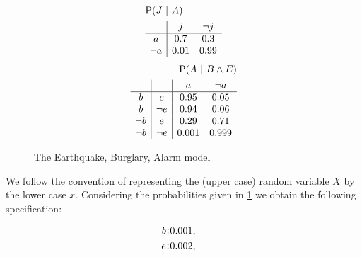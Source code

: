 \documentclass[a4paper, 10pt]{article}
\newcommand{\at}[1]{\ensuremath{\!\del{#1}}}
\newcommand{\pr}[1]{\ensuremath{\mathrm{P}\at{#1}}}
\newcommand{\given}{\ensuremath{~\middle|~}}
\newcommand{\probfact}[2]{\ensuremath{#2\mkern-4mu:\mkern-4mu#1}}
\begin{document}
\begin{figure}
\begin{multicols}{3}
        \footnotesize{
            \begin{equation*}
                \begin{split}
                    &\pr{J \given A}\\
                    &  \begin{array}{c|cc}
                               & j    & \neg j \\
                        \hline
                        a      & 0.7  & 0.3    \\
                        \neg a & 0.01 & 0.99
                    \end{array}
                \end{split}
            \end{equation*}
        }
        \footnotesize{
            \begin{equation*}
                \begin{split}
                    \pr{A \given B \wedge E}\\
                    \begin{array}{c|c|cc}
                               &        & a     & \neg a \\
                        \hline
                        b      & e      & 0.95  & 0.05   \\
                        b      & \neg e & 0.94  & 0.06   \\
                        \neg b & e      & 0.29  & 0.71   \\
                        \neg b & \neg e & 0.001 & 0.999
                    \end{array}
                \end{split}
            \end{equation*}
        }
    \end{multicols}
    \caption{The Earthquake, Burglary, Alarm model}
    \label{Figure_Alarm}
\end{figure}

We follow the convention of representing the (upper case) random variable $X$ by the lower case $x$.
%
Considering the probabilities given in \cref{Figure_Alarm} we obtain the following spe\-ci\-fi\-ca\-tion:

\begin{equation*}
    \begin{aligned}
        \probfact{0.001}{b} & ,\cr
        \probfact{0.002}{e} & ,\cr
    \end{aligned}
    \label{eq:not_so_simple_example}
\end{equation*}
\end{document}
